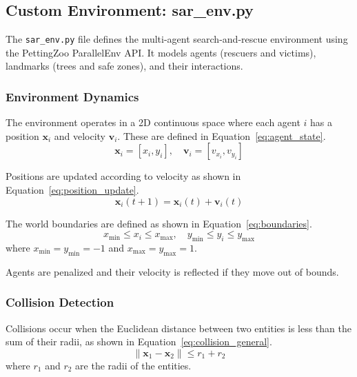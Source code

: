 \documentclass[11pt,a4paper]{article}
\begin{document}
\subsection{Custom Environment: sar\_env.py}
\label{subsec:sar_env}

The \texttt{sar\_env.py} file defines the multi-agent search-and-rescue environment using the PettingZoo ParallelEnv API.
It models agents (rescuers and victims), landmarks (trees and safe zones), and their interactions.

\subsubsection{Environment Dynamics}
\label{subsubsec:env_dynamics}

The environment operates in a 2D continuous space where each agent $i$ has a position $\mathbf{x}_i$ and velocity $\mathbf{v}_i$.
These are defined in Equation~\ref{eq:agent_state}.
\begin{equation}
\label{eq:agent_state}
\mathbf{x}_i = [x_i, y_i], \quad \mathbf{v}_i = [v_{x_i}, v_{y_i}]
\end{equation}

Positions are updated according to velocity as shown in Equation~\ref{eq:position_update}.
\begin{equation}
\label{eq:position_update}
\mathbf{x}_i(t+1) = \mathbf{x}_i(t) + \mathbf{v}_i(t)
\end{equation}

The world boundaries are defined as shown in Equation~\ref{eq:boundaries}.
\begin{equation}
\label{eq:boundaries}
x_{\min} \leq x_i \leq x_{\max}, \quad y_{\min} \leq y_i \leq y_{\max}
\end{equation}
where $x_{\min} = y_{\min} = -1$ and $x_{\max} = y_{\max} = 1$.

Agents are penalized and their velocity is reflected if they move out of bounds.

\subsubsection{Collision Detection}
\label{subsubsec:collision_detection}

Collisions occur when the Euclidean distance between two entities is less than the sum of their radii, as shown in Equation~\ref{eq:collision_general}.
\begin{equation}
\label{eq:collision_general}
\|\mathbf{x}_1 - \mathbf{x}_2\| \leq r_1 + r_2
\end{equation}
where $r_1$ and $r_2$ are the radii of the entities.
\end{document}
